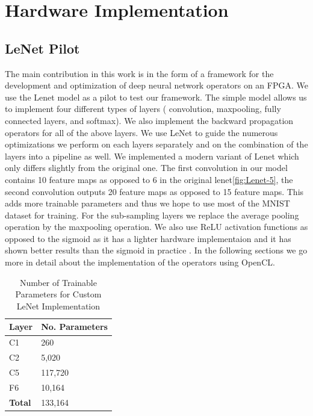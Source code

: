 
\chapter{Hardware Implementation} %

\label{Chapter3} %


\section{LeNet Pilot} \label{lenetpilot}

The main contribution in this work is in the form of a framework for the development and optimization of deep neural network operators on an FPGA. We use the Lenet \cite{lenet} model as a pilot to test our framework. The simple model allows us to implement four different types of layers ( convolution, maxpooling, fully connected layers, and softmax). We also implement the backward propagation operators for all of the above layers.  We use LeNet to guide the numerous optimizations we perform on each layers separately and on the combination of the layers into a pipeline as well. We implemented a modern variant of Lenet which only differs slightly from the original one. The first convolution in our model contains 10 feature maps as opposed to 6 in the original lenet\ref{fig:Lenet-5}, the second convolution outputs 20 feature maps as opposed to 15 feature maps. This adds more trainable parameters and thus we hope to use most of the MNIST dataset for training. For the sub-sampling layers we replace the average pooling operation by the maxpooling operation. We also use ReLU activation functions as opposed to the sigmoid as it has a lighter hardware implementaion and it has shown better results than the sigmoid in practice \cite{alexnet}. In the following sections we go more in detail about the implementation of the operators using OpenCL. 

\begin{table}[]
\centering
\begin{tabular}{ll}
\hline
\multicolumn{1}{|l|}{\textbf{Layer}} & \multicolumn{1}{l|}{ \textbf{No. Parameters}} \\ \hline
\multicolumn{1}{|l|}{C1}    & \multicolumn{1}{l|}{260}                            \\ \hline
\multicolumn{1}{|l|}{C2}    & \multicolumn{1}{l|}{5,020}                          \\ \hline
\multicolumn{1}{|l|}{C5}    & \multicolumn{1}{l|}{117,720}                        \\ \hline
\multicolumn{1}{|l|}{F6}    & \multicolumn{1}{l|}{10,164}                        \\ \hline
\multicolumn{1}{|l|}{\textbf{Total}}    & \multicolumn{1}{l|}{133,164}                        \\ \hline
\end{tabular}
\label{tab:custom-lenet}        
\caption{Number of Trainable Parameters for Custom LeNet Implementation}             
\end{table}



